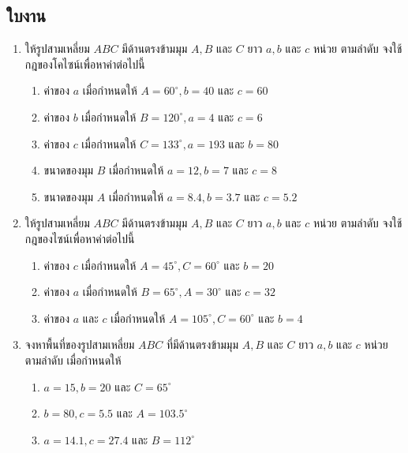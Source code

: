 \subsection*{ใบงาน}
\begin{enumerate}[label=\arabic*., leftmargin=*, itemsep=1em]
	\item ให้รูปสามเหลี่ยม $ABC$ มีด้านตรงข้ามมุม $A, B$ และ $C$ ยาว $a, b$ และ $c$ หน่วย ตามลำดับ จงใช้กฎของโคไซน์เพื่อหาค่าต่อไปนี้
	\begin{enumerate}[label=\theenumi\arabic*), leftmargin=1.5em, itemsep=0.6em]
		\everymath{\displaystyle}
		\item ค่าของ $a$ เมื่อกำหนดให้ $A = 60^{\circ}, b = 40$ และ $c = 60$
		\item ค่าของ $b$ เมื่อกำหนดให้ $B = 120^{\circ}, a = 4$ และ $c = 6$
		\item ค่าของ $c$ เมื่อกำหนดให้ $C = 133^{\circ}, a = 193$ และ $b = 80$
		\item ขนาดของมุม $B$ เมื่อกำหนดให้ $a = 12, b = 7$ และ $c = 8$
		\item ขนาดของมุม $A$ เมื่อกำหนดให้ $a = 8.4, b = 3.7$ และ $c = 5.2$
	\end{enumerate}
	
	\item ให้รูปสามเหลี่ยม $ABC$ มีด้านตรงข้ามมุม $A, B$ และ $C$ ยาว $a, b$ และ $c$ หน่วย ตามลำดับ จงใช้กฎของไซน์เพื่อหาค่าต่อไปนี้
	\begin{enumerate}[label=\theenumi\arabic*), leftmargin=1.5em, itemsep=0.6em]
		\everymath{\displaystyle}
		\item ค่าของ $c$ เมื่อกำหนดให้ $A = 45^{\circ}, C = 60^{\circ}$ และ $b = 20$
		\item ค่าของ $a$ เมื่อกำหนดให้ $B = 65^{\circ}, A = 30^{\circ}$ และ $c = 32$
		\item ค่าของ $a$ และ $c$ เมื่อกำหนดให้ $A = 105^{\circ}, C = 60^{\circ}$ และ $b = 4$
	\end{enumerate}
	
	\item จงหาพื้นที่ของรูปสามเหลี่ยม $ABC$ ที่มีด้านตรงข้ามมุม $A, B$ และ $C$ ยาว $a, b$ และ $c$ หน่วย ตามลำดับ เมื่อกำหนดให้
	\begin{enumerate}[label=\theenumi\arabic*), leftmargin=1.5em, itemsep=0.6em]
		\everymath{\displaystyle}
		\item $a = 15, b = 20$ และ $C = 65^{\circ}$
		\item $b = 80, c = 5.5$ และ $A = 103.5^{\circ}$
		\item $a = 14.1, c = 27.4$ และ $B = 112^{\circ}$
	\end{enumerate}
	

\end{enumerate}
